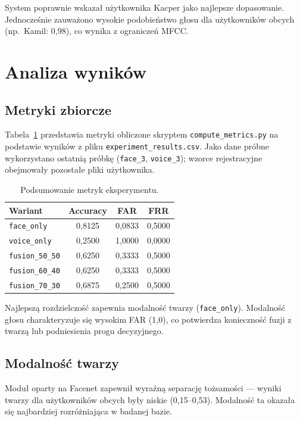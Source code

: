 System poprawnie wskazał użytkownika Kacper jako najlepsze dopasowanie. Jednocześnie zauważono wysokie podobieństwo głosu dla użytkowników obcych (np.\ Kamil: 0{,}98), co wynika z ograniczeń MFCC.

\section{Analiza wyników}

\subsection{Metryki zbiorcze}

Tabela~\ref{tab:metrics_summary} przedstawia metryki obliczone skryptem \texttt{compute\_metrics.py} na podstawie wyników z pliku \texttt{experiment\_results.csv}. Jako dane próbne wykorzystano ostatnią próbkę (\texttt{face\_3}, \texttt{voice\_3}); wzorce rejestracyjne obejmowały pozostałe pliki użytkownika.

\begin{table}[H]
    \centering
    \caption{Podsumowanie metryk eksperymentu.\label{tab:metrics_summary}}
    \begin{tabular}{lccc}
        \toprule
        Wariant & Accuracy & FAR & FRR \\
        \midrule
        \texttt{face\_only} & 0{,}8125 & 0{,}0833 & 0{,}5000 \\
        \texttt{voice\_only} & 0{,}2500 & 1{,}0000 & 0{,}0000 \\
        \texttt{fusion\_50\_50} & 0{,}6250 & 0{,}3333 & 0{,}5000 \\
        \texttt{fusion\_60\_40} & 0{,}6250 & 0{,}3333 & 0{,}5000 \\
        \texttt{fusion\_70\_30} & 0{,}6875 & 0{,}2500 & 0{,}5000 \\
        \bottomrule
    \end{tabular}
\end{table}

Najlepszą rozdzielczość zapewnia modalność twarzy (\texttt{face\_only}). Modalność głosu charakteryzuje się wysokim FAR (1{,}0), co potwierdza konieczność fuzji z twarzą lub podniesienia progu decyzyjnego.

\subsection{Modalność twarzy}

Moduł oparty na Facenet zapewnił wyraźną separację tożsamości --- wyniki twarzy dla użytkowników obcych były niskie (0{,}15--0{,}53). Modalność ta okazała się najbardziej rozróżniająca w badanej bazie.

